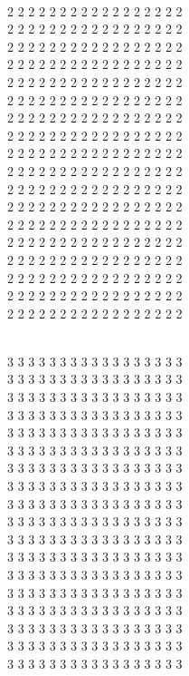 \documentclass{article}
\begin{document}
\vspace{5mm}
\hspace{2mm} \\
2 2 2 2 2 2 2 2 2 2 2 2 2 2 2 2 2 \\
2 2 2 2 2 2 2 2 2 2 2 2 2 2 2 2 2 \\
2 2 2 2 2 2 2 2 2 2 2 2 2 2 2 2 2 \\
2 2 2 2 2 2 2 2 2 2 2 2 2 2 2 2 2 \\
2 2 2 2 2 2 2 2 2 2 2 2 2 2 2 2 2 \\
2 2 2 2 2 2 2 2 2 2 2 2 2 2 2 2 2 \\
2 2 2 2 2 2 2 2 2 2 2 2 2 2 2 2 2 \\
2 2 2 2 2 2 2 2 2 2 2 2 2 2 2 2 2 \\
2 2 2 2 2 2 2 2 2 2 2 2 2 2 2 2 2 \\
2 2 2 2 2 2 2 2 2 2 2 2 2 2 2 2 2 \\
2 2 2 2 2 2 2 2 2 2 2 2 2 2 2 2 2 \\
2 2 2 2 2 2 2 2 2 2 2 2 2 2 2 2 2 \\
2 2 2 2 2 2 2 2 2 2 2 2 2 2 2 2 2 \\
2 2 2 2 2 2 2 2 2 2 2 2 2 2 2 2 2 \\
2 2 2 2 2 2 2 2 2 2 2 2 2 2 2 2 2 \\
2 2 2 2 2 2 2 2 2 2 2 2 2 2 2 2 2 \\
2 2 2 2 2 2 2 2 2 2 2 2 2 2 2 2 2 \\
2 2 2 2 2 2 2 2 2 2 2 2 2 2 2 2 2 \\

\pagebreak

\vspace{5mm}
\hspace{2mm} \\
3 3 3 3 3 3 3 3 3 3 3 3 3 3 3 3 3 \\
3 3 3 3 3 3 3 3 3 3 3 3 3 3 3 3 3 \\
3 3 3 3 3 3 3 3 3 3 3 3 3 3 3 3 3 \\
3 3 3 3 3 3 3 3 3 3 3 3 3 3 3 3 3 \\
3 3 3 3 3 3 3 3 3 3 3 3 3 3 3 3 3 \\
3 3 3 3 3 3 3 3 3 3 3 3 3 3 3 3 3 \\
3 3 3 3 3 3 3 3 3 3 3 3 3 3 3 3 3 \\
3 3 3 3 3 3 3 3 3 3 3 3 3 3 3 3 3 \\
3 3 3 3 3 3 3 3 3 3 3 3 3 3 3 3 3 \\
3 3 3 3 3 3 3 3 3 3 3 3 3 3 3 3 3 \\
3 3 3 3 3 3 3 3 3 3 3 3 3 3 3 3 3 \\
3 3 3 3 3 3 3 3 3 3 3 3 3 3 3 3 3 \\
3 3 3 3 3 3 3 3 3 3 3 3 3 3 3 3 3 \\
3 3 3 3 3 3 3 3 3 3 3 3 3 3 3 3 3 \\
3 3 3 3 3 3 3 3 3 3 3 3 3 3 3 3 3 \\
3 3 3 3 3 3 3 3 3 3 3 3 3 3 3 3 3 \\
3 3 3 3 3 3 3 3 3 3 3 3 3 3 3 3 3 \\
3 3 3 3 3 3 3 3 3 3 3 3 3 3 3 3 3 \\
\end{document}
